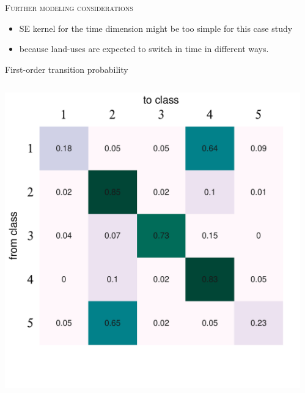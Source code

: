 \documentclass[8pt]{beamer} %
\begin{document}
\begin{frame}[t]

\textsc{Further modeling considerations}

\begin{itemize}\setlength\itemsep{2mm}
\item SE kernel for the time dimension might be too simple for this case study
 
\item because land-uses are expected to switch in time in different ways.
\end{itemize}

\vspace{5mm}

First-order transition probability %

\begin{columns}
\vspace{1mm}
\centering \includegraphics[scale=0.25, trim = 0mm 0mm 10mm 0mm, clip]{ch5_fig25_transmatrix_landuses.pdf}

\begin{itemize}\setlength\itemsep{2mm}
\small


\end{itemize}
\end{columns}
\end{frame}
\end{document}
